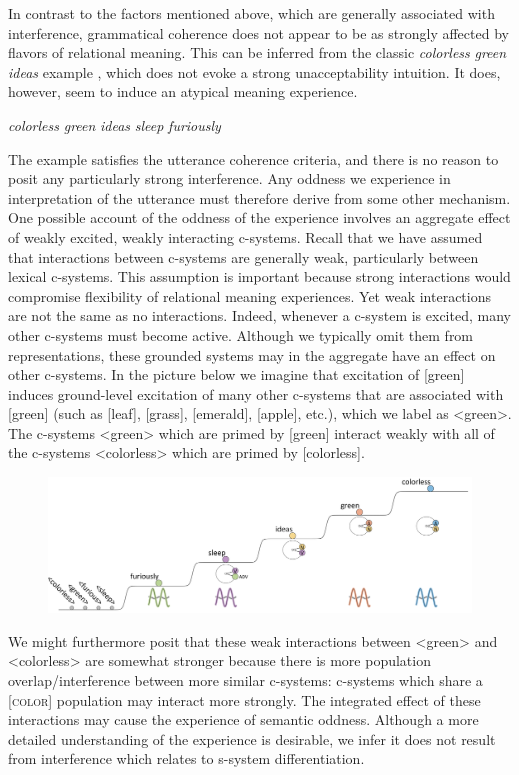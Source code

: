 In contrast to the factors mentioned above, which are generally associated with interference, grammatical coherence does not appear to be as strongly affected by flavors of relational meaning. This can be inferred from the classic \textit{colorless} \textit{green} \textit{ideas} example \citep{Chomsky1956}, which does not evoke a strong unacceptability intuition. It does, however, seem to induce an atypical meaning experience.

    \textit{colorless} \textit{green} \textit{ideas} \textit{sleep} \textit{furiously}

  The example satisfies the utterance coherence criteria, and there is no reason to posit any particularly strong interference. Any oddness we experience in interpretation of the utterance must therefore derive from some other mechanism. One possible account of the oddness of the experience involves an aggregate effect of weakly excited, weakly interacting c-systems. Recall that we have assumed that interactions between c-systems are generally weak, particularly between lexical c-systems. This assumption is important because strong interactions would compromise flexibility of relational meaning experiences. Yet weak interactions are not the same as no interactions. Indeed, whenever a c-system is excited, many other c-systems must become active. Although we typically omit them from representations, these grounded systems may in the aggregate have an effect on other c-systems. In the picture below we imagine that excitation of [green] induces ground-level excitation of many other c-systems that are associated with [green] (such as [leaf], [grass], [emerald], [apple], etc.), which we label as <green>. The c-systems <green> which are primed by [green] interact weakly with all of the c-systems <colorless> which are primed by [colorless]. 

  
\begin{figure}
\includegraphics[width=\textwidth]{figures/Tilsen-img134.png}
\caption{\missingcaption}
\label{fig:}
\end{figure}
 

  We might furthermore posit that these weak interactions between <green> and <colorless> are somewhat stronger because there is more population overlap/interference between more similar c-systems: c-systems which share a [\textsc{color}] population may interact more strongly. The integrated effect of these interactions may cause the experience of semantic oddness. Although a more detailed understanding of the experience is desirable, we infer it does not result from interference which relates to s-system differentiation.

